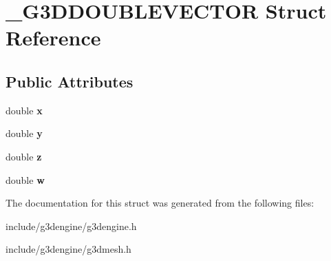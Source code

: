 \hypertarget{struct__G3DDOUBLEVECTOR}{}\section{\+\_\+\+G3\+D\+D\+O\+U\+B\+L\+E\+V\+E\+C\+T\+OR Struct Reference}
\label{struct__G3DDOUBLEVECTOR}
\subsection*{Public Attributes}
\begin{DoxyCompactItemize}
\item 
\mbox{\label{struct__G3DDOUBLEVECTOR_a73b0d2b4db41dcf2aa20c9775f99720e}} 
double {\bfseries x}
\item 
\mbox{\label{struct__G3DDOUBLEVECTOR_a70a972450dd0f70630133919554d5731}} 
double {\bfseries y}
\item 
\mbox{\label{struct__G3DDOUBLEVECTOR_a7cfd93505e87e9fe7e25859cfe0e58e5}} 
double {\bfseries z}
\item 
\mbox{\label{struct__G3DDOUBLEVECTOR_aa9578b5e1ecf5e86b4583f1ed65b285d}} 
double {\bfseries w}
\end{DoxyCompactItemize}


The documentation for this struct was generated from the following files\+:\begin{DoxyCompactItemize}
\item 
include/g3dengine/g3dengine.\+h\item 
include/g3dengine/g3dmesh.\+h\end{DoxyCompactItemize}
